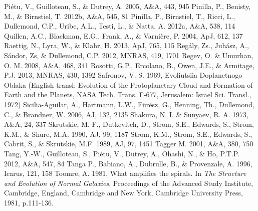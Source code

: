 \documentclass[apj]{emulateapj}
\begin{document}
\begin{thebibliography}{}
 Pi\'etu, V., Guilloteau, S., \& Dutrey, A. 2005, A\&A, 443, 945
 Pinilla, P., Benisty, M., \& Birnstiel, T. 2012b, A\&A, 545, 81
 Pinilla, P., Birnstiel, T., Ricci, L., Dullemond, C.P., Uribe, A.L., Testi, L., \& Natta, A. 2012a, A\&A, 538, 114 
 Quillen, A.C., Blackman, E.G., Frank, A., \& Varni\`ere, P. 2004, ApJ, 612, 137
 Raettig, N., Lyra, W., \& Klahr, H. 2013, ApJ, 765, 115
 Reg\'aly, Zs., Juh\'asz,  A., S\'andor, Zs, \& Dullemond, C.P. 2012, MNRAS, 419, 1701
 Regev, O. \& Umurhan, O. M. 2008, A\&A, 468, 341
 Rosotti, G.P., Ercolano, B., Owen, J.E., \& Armitage, P.J. 2013, MNRAS, 430, 1392 
 Safronov, V. S. 1969, Evoliutsiia Doplanetnogo Oblaka (English transl: Evolution of the Protoplanetary Cloud and Formation of Earth and the Planets, NASA Tech. Trans. F-677, Jerusalem: Israel Sci. Transl., 1972)
 Sicilia-Aguilar, A., Hartmann, L.W., F\"ur\'esz, G., Henning, Th., Dullemond, C., \& Brandner, W. 2006, AJ, 132, 2135
 Shakura, N. I. \& Sunyaev, R. A. 1973, A\&A, 24, 337
 Skrutskie, M. F., Dutkevitch, D., Strom, S.E., Edwards, S., Strom, K.M., \& Shure, M.A. 1990, AJ, 99, 1187
 Strom, K.M., Strom, S.E., Edwards, S., Cabrit, S., \& Skrutskie, M.F. 1989, AJ, 97, 1451
 Tagger M. 2001, A\&A, 380, 750
 Tang, Y.-W., Guilloteau, S., Pi\'etu, V., Dutrey, A., Ohashi, N., \& Ho, P.T.P. 2012, A\&A, 547, 84
 Tanga P., Babiano, A., Dubrulle, B., \& Provenzale, A. 1996, Icarus, 121, 158
 Toomre, A. 1981, What amplifies the spirals. In {\it The Structure and Evolution of Normal Galaxies}, Proceedings of the Advanced Study Institute, Cambridge, England, Cambridge and New York, Cambridge University Press, 1981, p.111-136.

\end{thebibliography}
\end{document}
